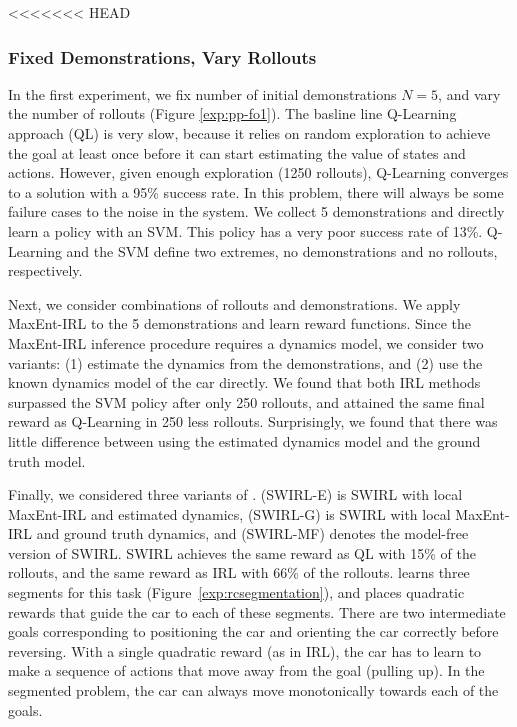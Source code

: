 <<<<<<< HEAD
\subsubsection{Fixed Demonstrations, Vary Rollouts}
In the first experiment, we fix number of initial demonstrations $N=5$, and vary the number of rollouts (Figure \ref{exp:pp-fo1}).
The basline line Q-Learning approach (QL) is very slow, because it relies on random exploration to achieve the goal at least once before it can start estimating the value of states and actions.
However, given enough exploration (1250 rollouts), Q-Learning converges to a solution with a 95\% success rate.
In this problem, there will always be some failure cases to the noise in the system.
We collect 5 demonstrations and directly learn a policy with an SVM.
This policy has a very poor success rate of 13\%.
Q-Learning and the SVM define two extremes, no demonstrations and no rollouts, respectively.

Next, we consider combinations of rollouts and demonstrations.
We apply MaxEnt-IRL to the 5 demonstrations and learn reward functions.
Since the MaxEnt-IRL inference procedure requires a dynamics model, we consider two variants: (1) estimate the dynamics from the demonstrations, and (2) use the known dynamics model of the car directly.
We found that both IRL methods surpassed the SVM policy after only 250 rollouts, and attained the same final reward as Q-Learning in 250 less rollouts.
Surprisingly, we found that there was little difference between using the estimated dynamics model and the ground truth model.

Finally, we considered three variants of \hirl. (SWIRL-E) is SWIRL with local MaxEnt-IRL and estimated dynamics, (SWIRL-G) is SWIRL with local MaxEnt-IRL and ground truth dynamics, and (SWIRL-MF) denotes the model-free version of SWIRL.
SWIRL achieves the same reward as QL with 15\% of the rollouts, and the same reward as IRL with 66\% of the rollouts.
\hirl learns three segments for this task (Figure~\ref{exp:rcsegmentation}), and places quadratic rewards that guide the car to each of these segments.
There are two intermediate goals corresponding to positioning the car and orienting the car correctly before reversing.
With a single quadratic reward (as in IRL), the car has to learn to make a sequence of actions that move away from the goal (pulling up). In the segmented problem, the car can always move monotonically towards each of the goals.


